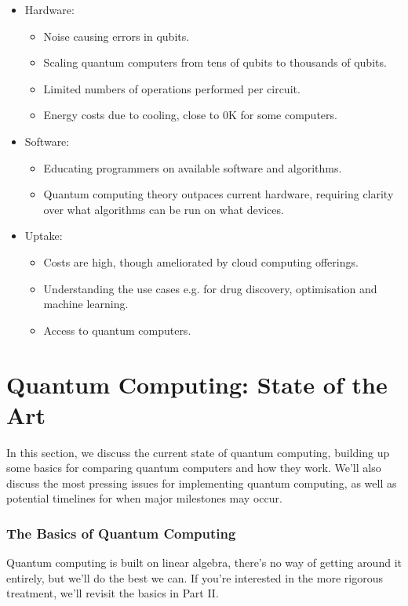 \documentclass{article}
\theoremstyle{definition}
\begin{document}
\begin{itemize}
    \item Hardware: 
    \begin{itemize}
        \item Noise causing errors in qubits.
        \item Scaling quantum computers from tens of qubits to thousands of qubits.
        \item Limited numbers of operations performed per circuit.
        \item Energy costs due to cooling, close to 0K for some computers. 
    \end{itemize}
    \item Software:
    \begin{itemize}
        \item Educating programmers on available software and algorithms.
        \item Quantum computing theory outpaces current hardware, requiring clarity over what algorithms can be run on what devices.
    \end{itemize}
    \item Uptake:
    \begin{itemize}
        \item Costs are high, though ameliorated by cloud computing offerings.
        \item Understanding the use cases e.g. for drug discovery, optimisation and machine learning.
        \item Access to quantum computers. 
    \end{itemize}
\end{itemize}


\clearpage
\tableofcontents

\clearpage
\part{Quantum Computing: State of the Art}
In this section, we discuss the current state of quantum computing, building up some basics for comparing quantum computers and how they work. We'll also discuss the most pressing issues for implementing quantum computing, as well as potential timelines for when major milestones may occur. 


\section{The Basics of Quantum Computing}
Quantum computing is built on linear algebra, there's no way of getting around it entirely, but we'll do the best we can. If you're interested in the more rigorous treatment, we'll revisit the basics in Part II.
\end{document}
